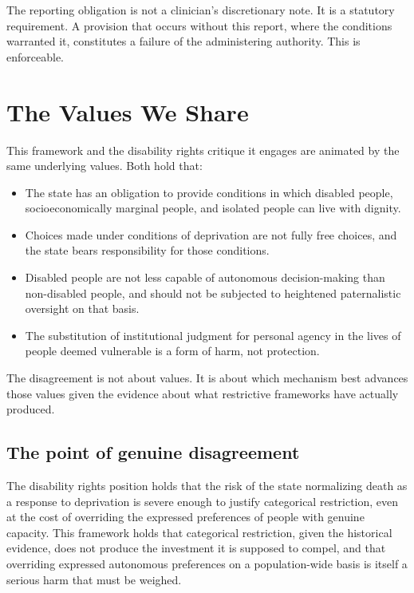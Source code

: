 \documentclass[11pt, letterpaper]{article}
\begin{document}
The reporting obligation is not a clinician's discretionary note. It is a statutory
requirement. A provision that occurs without this report, where the conditions warranted
it, constitutes a failure of the administering authority. This is enforceable.

\section{The Values We Share}

This framework and the disability rights critique it engages are animated by the same
underlying values. Both hold that:

\begin{itemize}
  \item The state has an obligation to provide conditions in which disabled people,
    socioeconomically marginal people, and isolated people can live with dignity.
  \item Choices made under conditions of deprivation are not fully free choices, and
    the state bears responsibility for those conditions.
  \item Disabled people are not less capable of autonomous decision-making than
    non-disabled people, and should not be subjected to heightened paternalistic
    oversight on that basis.
  \item The substitution of institutional judgment for personal agency in the lives
    of people deemed vulnerable is a form of harm, not protection.
\end{itemize}

The disagreement is not about values. It is about which mechanism best advances those
values given the evidence about what restrictive frameworks have actually produced.

\subsection{The point of genuine disagreement}

The disability rights position holds that the risk of the state normalizing death as a
response to deprivation is severe enough to justify categorical restriction, even at the
cost of overriding the expressed preferences of people with genuine capacity. This framework
holds that categorical restriction, given the historical evidence, does not produce the
investment it is supposed to compel, and that overriding expressed autonomous preferences
on a population-wide basis is itself a serious harm that must be weighed.
\end{document}
